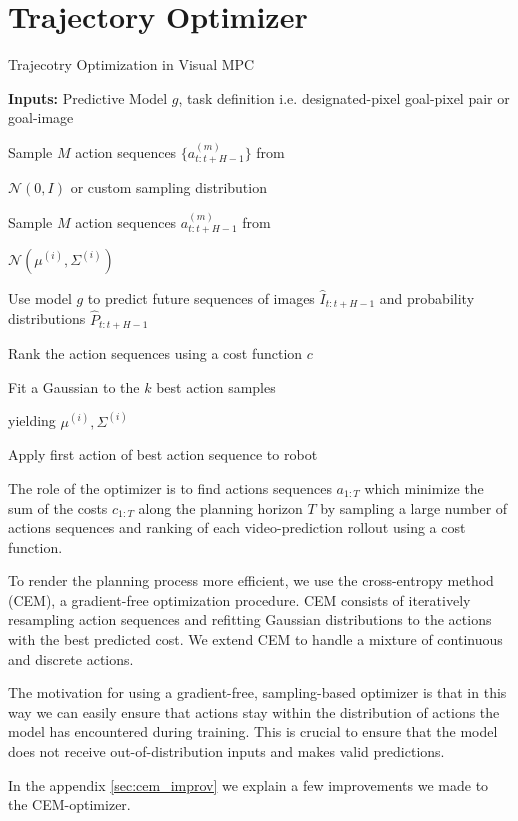 \section{Trajectory Optimizer}

\begin{algorithm}[ht]
\caption{Trajecotry Optimization in Visual MPC}
\label{sarsalambdafa}
\begin{algorithmic}[1]
\State \textbf{Inputs:} Predictive Model $g$, task definition i.e. designated-pixel goal-pixel pair or goal-image

\State \begin{varwidth}[t]{\linewidth}
	Sample $M$ action sequences $\{a^{(m)}_{t:t+H-1}\}$ from \par $\mathcal N(0, I)$ or
	custom sampling distribution
\end{varwidth}
\Else
\State \begin{varwidth}[t]{\linewidth}
	Sample $M$ action sequences ${a^{(m)}_{t:t+H-1}}$ from \par 
	$\mathcal N(\mu^{(i)}, \Sigma^{(i)})$
\end{varwidth}
\EndIf
\State  \begin{varwidth}[t]{\linewidth}
	Use model $g$ to predict future sequences of images $\hat{I}_{t:t+H-1}$ and probability distributions $\hat{P}_{t:t+H-1}$
\end{varwidth}
\State Rank the action sequences using a cost function $c$
\State  \begin{varwidth}[t]{\linewidth}
	Fit a Gaussian to the $k$ best action samples \par 
	yielding $\mu^{(i)}, \Sigma^{(i)}$
\end{varwidth}
\EndFor
\State Apply first action of best action sequence to robot
\EndFor
\end{algorithmic}
\end{algorithm}


\label{sec:optimizer}
The role of the optimizer is to find actions sequences $a_{1:T}$ which minimize the sum of the costs $c_{1:T}$ along the planning horizon $T$ by sampling a large number of actions sequences and ranking of each video-prediction rollout using a cost function.

To render the planning process more efficient, we use the cross-entropy method (CEM), a gradient-free optimization procedure.
CEM consists of iteratively resampling action sequences and refitting Gaussian distributions to the actions with the best predicted cost. 
We extend CEM to handle a mixture of continuous and discrete actions.

The motivation for using a gradient-free, sampling-based optimizer is that in this way we can easily ensure that actions stay within the distribution of actions the model has encountered during training. This is crucial to ensure that the model does not receive out-of-distribution inputs and makes valid predictions. 

In the appendix \ref{sec:cem_improv} we explain a few improvements we made to the CEM-optimizer.